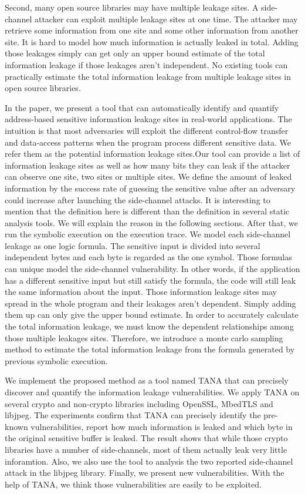 Second, many open source libraries may have multiple leakage sites. 
A side-channel attacker\cite{191010} can exploit multiple leakage sites at one time. The attacker
may retrieve some information from one site and some other information from another site.
It is hard to model how much information is actually leaked in total. Adding those leakages 
simply can get only an upper bound estimate of the total information leakage if those 
leakages aren’t independent. No existing tools can practically estimate the total information 
leakage from multiple leakage sites in open source libraries.

In the paper, we present a tool that can automatically identify and quantify address-based
sensitive information leakage sites in real-world applications. The intuition is that most
adversaries will exploit the different control-flow transfer and data-access patterns when 
the program process different sensitive data. We refer them as the potential information
leakage sites.Our tool can provide a list of information leakage sites as well as how many 
bits they can leak if the attacker can observe one site, two sites or multiple sites. 
We define the amount of leaked information by the success rate of guessing the sensitive value after 
an adversary could increase after launching the side-channel attacks. It is interesting to 
mention that the definition here is different than the  definition in several static analysis 
tools. We will explain the reason in the following  sections. After that, we run the symbolic 
execution on the execution trace. We model each side-channel leakage as one logic formula. 
The sensitive input is divided into several independent bytes and each byte is regarded as 
the one symbol. Those formulas can unique model the side-channel vulnerability. 
In other words, if the application has a different sensitive input but still satisfy the formula, 
the code will still leak the same information about the input.  
Those information leakage sites may spread in the whole program 
and their leakages aren’t dependent. Simply adding them up can only give the upper bound 
estimate. In order to accurately calculate the total information leakage, we must know the 
dependent relationships among those multiple leakages sites. Therefore, we introduce a 
monte carlo sampling method to estimate the total information leakage from the formula
generated by previous symbolic execution. 

We implement the proposed method as a tool named TANA that can precisely discover and quantify the information
leakage vulnerabilities. We apply TANA on several crypto and non-crypto libraries including OpenSSL,
MbedTLS and libjpeg. The experiments confirm that TANA can precisely identify the pre-known vulnerabilities,
report how much information is leaked and which byte in the original sensitive buffer is leaked. 
The result shows that while those crypto libraries have a number of side-channels, most of them actually
leak very little inforamtion. Also, we also use the tool to analysis the two reported side-channel attack 
in the libjpeg library. Finally, we present new vulnerabilities. With the help of TANA, we think those
vulnerabilities are easily to be exploited.

